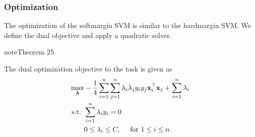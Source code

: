 \documentclass[letterpaper,10pt,english]{jupyterBook}
\begin{document}
\subsubsection{Optimization}
\label{\detokenize{classification_svms:id1}}
\sphinxAtStartPar
The optimization of the soft\sphinxhyphen{}margin SVM is similar to the hard\sphinxhyphen{}margin SVM. We define the dual objective and apply a quadratic solver.
\label{classification_svms:theorem-7}
\begin{sphinxadmonition}{note}{Theorem 25}



\sphinxAtStartPar
The dual optimization objective to the  task is given as
\begin{equation}\label{equation:classification_svms:svm_form9}
\begin{split}\begin{align*}
\max_{\boldsymbol{\lambda}}  &  - \frac{1}{4} \sum_{i=1}^{n} \sum_{j=1}^{n} \lambda_{i} \lambda_{j} y_{i} y_{j} {\bf x}_{i}^\top {\bf x}_{j} + \sum_{i=1}^{n} \lambda_{i} \\
\text{s.t. }  &  \sum_{i=1}^{n} \lambda_{i} y_{i} = 0 \\
&  0 \leq \lambda_{i} \leq C, \quad \text{ for }1\leq i\leq n.
\end{align*}\end{split}
\end{equation}\end{sphinxadmonition}
\end{document}
